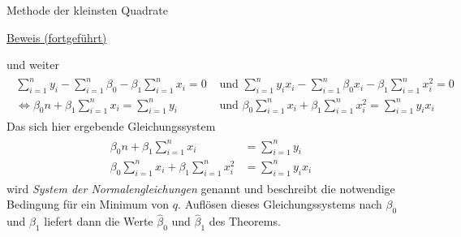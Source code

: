 \documentclass[
  8pt,
  ignorenonframetext,
]{beamer}
\begin{document}
\begin{frame}{Methode der kleinsten Quadrate}
\protect\hypertarget{methode-der-kleinsten-quadrate-9}{}
\tiny
\setlength{\abovedisplayskip}{3pt}
\setlength{\belowdisplayskip}{3pt}

\underline{Beweis (fortgeführt)}

und weiter \vspace{-2mm} \begin{align}
\begin{split}
\sum_{i=1}^n y_i    - \sum_{i=1}^n \beta_0     - \beta_1 \sum_{i=1}^n x_i    = 0 & \mbox{ und }
\sum_{i=1}^n y_ix_i - \sum_{i=1}^n \beta_0x_i  - \beta_1 \sum_{i=1}^n x_i^2  = 0 \\[-5pt]
\Leftrightarrow
\beta_0n  + \beta_1 \sum_{i=1}^n x_i    = \sum_{i=1}^n y_i & \mbox{ und }
\beta_0\sum_{i=1}^n x_i  + \beta_1 \sum_{i=1}^n x_i^2  = \sum_{i=1}^n y_ix_i
\end{split}
\end{align} Das sich hier ergebende Gleichungssystem \begin{align}
\begin{split}
\beta_0 n                + \beta_1 \sum_{i=1}^n x_i    & = \sum_{i=1}^n y_i    \\[-5pt]
\beta_0 \sum_{i=1}^n x_i + \beta_1 \sum_{i=1}^n x_i^2  & = \sum_{i=1}^n y_ix_i
\end{split}
\end{align} wird \textit{System der Normalengleichungen} genannt und
beschreibt die notwendige Bedingung für ein Minimum von \(q\). Auflösen
dieses Gleichungssystems nach \(\beta_0\) und \(\beta_1\) liefert dann
die Werte \(\hat{\beta}_0\) und \(\hat{\beta}_1\) des Theorems.
\end{frame}
\end{document}
